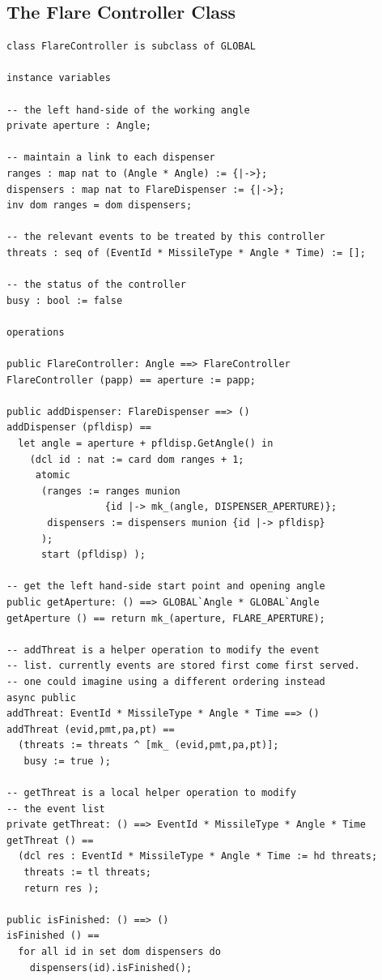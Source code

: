 \documentclass{overturerepchap}
\begin{document}
\subsection{The Flare Controller Class}

\begin{lstlisting}
class FlareController is subclass of GLOBAL

instance variables

-- the left hand-side of the working angle
private aperture : Angle;

-- maintain a link to each dispenser
ranges : map nat to (Angle * Angle) := {|->};
dispensers : map nat to FlareDispenser := {|->};
inv dom ranges = dom dispensers;

-- the relevant events to be treated by this controller
threats : seq of (EventId * MissileType * Angle * Time) := [];

-- the status of the controller
busy : bool := false

operations

public FlareController: Angle ==> FlareController
FlareController (papp) == aperture := papp;

public addDispenser: FlareDispenser ==> ()
addDispenser (pfldisp) ==
  let angle = aperture + pfldisp.GetAngle() in
    (dcl id : nat := card dom ranges + 1;
     atomic
      (ranges := ranges munion 
                 {id |-> mk_(angle, DISPENSER_APERTURE)};
       dispensers := dispensers munion {id |-> pfldisp}
      );
      start (pfldisp) );

-- get the left hand-side start point and opening angle
public getAperture: () ==> GLOBAL`Angle * GLOBAL`Angle
getAperture () == return mk_(aperture, FLARE_APERTURE);

-- addThreat is a helper operation to modify the event
-- list. currently events are stored first come first served.
-- one could imagine using a different ordering instead
async public
addThreat: EventId * MissileType * Angle * Time ==> ()
addThreat (evid,pmt,pa,pt) ==
  (threats := threats ^ [mk_ (evid,pmt,pa,pt)];
   busy := true );

-- getThreat is a local helper operation to modify 
-- the event list
private getThreat: () ==> EventId * MissileType * Angle * Time
getThreat () ==
  (dcl res : EventId * MissileType * Angle * Time := hd threats;
   threats := tl threats;
   return res );

public isFinished: () ==> ()
isFinished () ==
  for all id in set dom dispensers do
    dispensers(id).isFinished();


\end{lstlisting}
\end{document}
